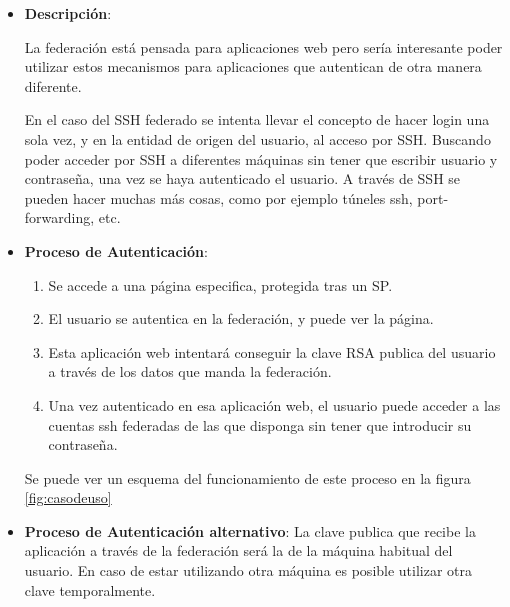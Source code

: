     \begin{itemize}

    \item \textbf{Descripción}:
    
    La federación está pensada para aplicaciones web pero sería
    interesante poder utilizar estos mecanismos para aplicaciones que
    autentican de otra manera diferente.

    En el caso del SSH federado se intenta llevar el concepto de hacer
    login una sola vez, y en la entidad de origen del usuario, al acceso por SSH. Buscando poder
    acceder por SSH a diferentes máquinas sin tener que escribir usuario y
    contraseña, una vez se haya autenticado el usuario.  A través de SSH se pueden
    hacer muchas más cosas, como por ejemplo túneles ssh, port-forwarding,
    etc.

    \item \textbf{Proceso de Autenticación}:
    \label{casouso}

    \begin{enumerate}

        \item Se accede a una página especifica, protegida tras un SP.

        \item El usuario se autentica en la federación, y puede ver la
        página.

        \item Esta aplicación web intentará conseguir la clave RSA publica
        del usuario a través de los datos que manda la federación.

        \item Una vez autenticado en esa aplicación web, el usuario puede
        acceder a las cuentas ssh federadas de las que disponga sin tener
        que introducir su contraseña.

    \end{enumerate}

    Se puede ver un esquema del funcionamiento de este proceso en la figura
    \ref{fig:casodeuso}

    \item \textbf{Proceso de Autenticación alternativo}:
    La clave publica que recibe la aplicación a través de la federación
    será la de la máquina habitual del usuario. En caso de estar utilizando
    otra máquina es posible utilizar otra clave temporalmente.

    \begin{enumerate}


\end{enumerate}
\end{itemize}

